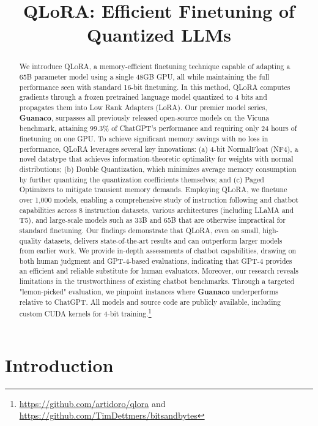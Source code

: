 \title{QLoRA: Efficient Finetuning of Quantized LLMs}

\begin{abstract}
We introduce \textsc{QLoRA}, a memory-efficient finetuning technique capable of adapting a 65B parameter model using a single 48GB GPU, all while maintaining the full performance seen with standard 16-bit finetuning. In this method, \textsc{QLoRA} computes gradients through a frozen pretrained language model quantized to 4 bits and propagates them into Low Rank Adapters (LoRA). Our premier model series, \textbf{Guanaco}, surpasses all previously released open-source models on the Vicuna benchmark, attaining 99.3\% of ChatGPT's performance and requiring only 24 hours of finetuning on one GPU. To achieve significant memory savings with no loss in performance, \textsc{QLoRA} leverages several key innovations: (a) 4-bit NormalFloat (NF4), a novel datatype that achieves information-theoretic optimality for weights with normal distributions; (b) Double Quantization, which minimizes average memory consumption by further quantizing the quantization coefficients themselves; and (c) Paged Optimizers to mitigate transient memory demands. Employing \textsc{QLoRA}, we finetune over 1,000 models, enabling a comprehensive study of instruction following and chatbot capabilities across 8 instruction datasets, various architectures (including LLaMA and T5), and large-scale models such as 33B and 65B that are otherwise impractical for standard finetuning. Our findings demonstrate that QLoRA, even on small, high-quality datasets, delivers state-of-the-art results and can outperform larger models from earlier work. We provide in-depth assessments of chatbot capabilities, drawing on both human judgment and GPT-4-based evaluations, indicating that GPT-4 provides an efficient and reliable substitute for human evaluators. Moreover, our research reveals limitations in the trustworthiness of existing chatbot benchmarks. Through a targeted "lemon-picked" evaluation, we pinpoint instances where \textbf{Guanaco} underperforms relative to ChatGPT. All models and source code are publicly available, including custom CUDA kernels for 4-bit training.\footnote{\url{https://github.com/artidoro/qlora} and \url{https://github.com/TimDettmers/bitsandbytes}}
\end{abstract}

\section{Introduction}


